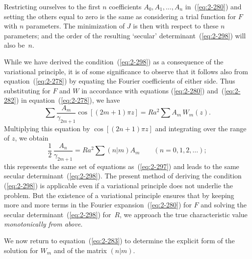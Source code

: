 Restricting ourselves to the first $n$ coefficients $A_0, A_1, \ldots, A_n$ in~(\ref{eq:2-280})
and setting the others equal to zero is the same as considering a trial
function for $F$ with $n$ parameters. The minimization of $J$ is then with
respect to these $n$ parameters; and the order of the resulting `secular'
determinant~(\ref{eq:2-298}) will also be~$n$.

While we have derived the condition~(\ref{eq:2-298}) as a consequence of the
variational principle, it is of some significance to observe that it follows
also from equation~(\ref{eq:2-278}) by equating the Fourier coefficients of either
side. Thus substituting for $F$ and $W$ in accordance with equations
(\ref{eq:2-280}) and~(\ref{eq:2-282}) in equation~(\ref{eq:2-278}), we have
\begin{equation}
\label{eq:2-299}
\sum \frac{A_m}{\gamma_{2m+1}}\cos[(2m+1)\pi z] = Ra^2 \sum A_m\,W_m(z).
\end{equation}
Multiplying this equation by $\cos[(2n+1)\pi z]$ and integrating over the
range of $z$, we obtain
\begin{equation}
\label{eq:2-300}
\frac{1}{2}\,\frac{A_n}{\gamma_{2m+1}} = Ra^2 \sum (n|m)A_m \qquad (n = 0, 1, 2, \ldots);
\end{equation}
this represents the same set of equations as~(\ref{eq:2-297}) and leads to the same
secular determinant~(\ref{eq:2-298}). The present method of deriving the condition
(\ref{eq:2-298}) is applicable even if a variational principle does not underlie the
problem. But the existence of a variational principle ensures that by
keeping more and more terms in the Fourier expansion~(\ref{eq:2-280}) for $F$ and
solving the secular determinant~(\ref{eq:2-298}) for~$R$, we approach the true
characteristic value \emph{monotonically from above}.

We now return to equation~(\ref{eq:2-283}) to determine the explicit form of
the solution for $W_m$ and of the matrix $(n|m)$.

